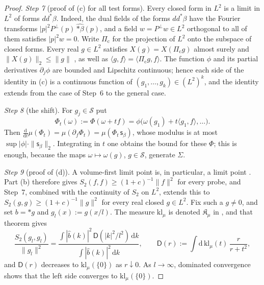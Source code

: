 \documentclass[11pt]{amsart}
\theoremstyle{definition}
\begin{document}
\begin{proof}
\emph{Step 7} (proof of (c) for all test forms).
Every closed form in $L^2$ is a limit in $L^2$ of forms $dd^*\beta$.
Indeed, the dual fields of the forms $dd^*\beta$ have the Fourier transforms $|p|^2P^\perp(p)\,\widehat{\ast\beta}(p)$, and a field $w=P^\perp w\in L^2$ orthogonal to all of them satisfies $|p|^2w=0$.
Write $\Pi_{\mathrm c}$ for the projection of $L^2$ onto the subspace of closed forms.
Every real $g\in L^2$ satisfies $X(g)=X(\Pi_{\mathrm c}g)$ almost surely and $\|X(g)\|_2\le\|g\|$ \cite[Remark~14.4, Lemma~14.3\,(a)]{QEDII}, as well as $\langle g,f\rangle=\langle\Pi_{\mathrm c}g,f\rangle$.
The function $\phi$ and its partial derivatives $\partial_j\phi$ are bounded and Lipschitz continuous; hence each side of the identity in (c) is a continuous function of $(g_1,\dots,g_k)\in(L^2)^k$, and the identity extends from the case of Step~6 to the general case.

\emph{Step 8} (the shift).
For $g_j\in\mathcal S$ put
\begin{equation*}
\Phi_t(\omega):=\Phi(\omega+tf)=\phi\bigl(\omega(g_1)+t\langle g_1,f\rangle,\dots\bigr).
\end{equation*}
Then $\frac{\mathrm d}{\mathrm dt}\mu(\Phi_t)=\allowbreak \mu(\partial_f\Phi_t)=\allowbreak \mu(\Phi_t\,\allowbreak \mathsf s_\beta)$, whose modulus is at most $\sup|\phi|\cdot\|\mathsf s_\beta\|_2$.
Integrating in $t$ one obtains the bound for these $\Phi$; this is enough, because the maps $\omega\mapsto\omega(g)$, $g\in\mathcal S$, generate $\Sigma$.

\emph{Step 9} (proof of (d)).
A volume-first limit point is, in particular, a limit point \cite[Theorem~1.3\,(a)]{QEDII}.
Part (b) therefore gives $S_2(f,f)\ge(1+c)^{-1}\|f\|^2$ for every probe, and Step~7, combined with the continuity of $S_2$ on $L^2$, extends this to $S_2(g,g)\ge(1+c)^{-1}\|g\|^2$ for every real closed $g\in L^2$.
Fix such a $g\ne0$, and set $b=\ast g$ and $g_l(x):=g(x/l)$.
The measure $\mathrm{kl}_\mu$ is denoted $\mathfrak K_\mu$ in \cite[Theorem~1.4, Part~I\,(d)]{QEDII}, and that theorem gives
\begin{equation*}
\frac{S_2(g_l,g_l)}{\|g_l\|^2}=\frac{\int|\hat b(k)|^2\,\mathsf D(|k|^2/l^2)\,\mathrm dk}{\int|\hat b(k)|^2\,\mathrm dk},\qquad\mathsf D(r):=\int\mathrm d\,\mathrm{kl}_\mu(t)\,\frac{r}{r+t^2},
\end{equation*}
and $\mathsf D(r)$ decreases to $\mathrm{kl}_\mu(\{0\})$ as $r\downarrow0$.
As $l\to\infty$, dominated convergence shows that the left side converges to $\mathrm{kl}_\mu(\{0\})$.
\end{proof}
\end{document}
